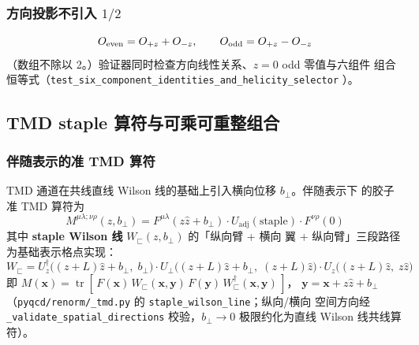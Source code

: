 \documentclass[11pt,a4paper]{ctexart}
\newcommand{\trc}{\operatorname{tr}}
\newcommand{\code}[1]{\texttt{#1}}
\newcommand{\bperp}{b_{\perp}}
\begin{document}
\subsubsection{方向投影不引入 $1/2$}

\begin{equation}
O_{\rm even} = O_{+z}+O_{-z}, \qquad
O_{\rm odd} = O_{+z}-O_{-z}
\end{equation}
（数组不除以 2。）验证器同时检查方向线性关系、$z=0$ odd 零值与六组件
组合恒等式（\code{test\_six\_component\_identities\_and\_helicity\_selector}
）。

\subsection{TMD staple 算符与可乘可重整组合}
\label{sec:tmd-operator}

\subsubsection{伴随表示的准 TMD 算符}

TMD 通道在共线直线 Wilson 线的基础上引入横向位移 $\bperp$。伴随表示下
的胶子准 TMD 算符为
\begin{equation}\label{eq:M-adj-tmd}
M^{\mu\lambda;\nu\rho}(z,\bperp)
= F^{\mu\lambda}(z\hat z+\bperp)\cdot U_{\mathrm{adj}}(\text{staple})
\cdot F^{\nu\rho}(0)
\end{equation}
其中 \textbf{staple Wilson 线} $W_\sqsubset(z,\bperp)$ 的「纵向臂 + 横向
翼 + 纵向臂」三段路径为基础表示格点实现：
\begin{equation}\label{eq:staple-wilson}
W_\sqsubset = U_z^\dagger\bigl((z+L)\hat z+\bperp,\;\bperp\bigr)
\cdot U_\perp\bigl((z+L)\hat z+\bperp,\;(z+L)\hat z\bigr)
\cdot U_z\bigl((z+L)\hat z,\; z\hat z\bigr)
\end{equation}
即
$M(\boldsymbol x)=\trc[\,F(\boldsymbol x)\,W_\sqsubset(\boldsymbol x,
\boldsymbol y)\,F(\boldsymbol y)\,W_\sqsubset^\dagger(\boldsymbol x,
\boldsymbol y)\,]$，
$\boldsymbol y=\boldsymbol x+z\hat z+\bperp$
（\code{pyqcd/renorm/\_tmd.py} 的 \code{staple\_wilson\_line}；纵向/横向
空间方向经 \code{\_validate\_spatial\_directions} 校验，$\bperp\to0$
极限约化为直线 Wilson 线共线算符）。
\end{document}
